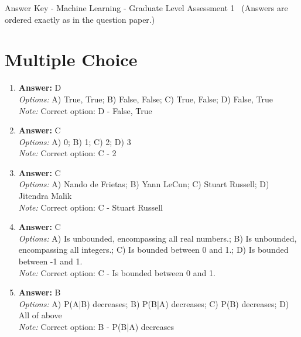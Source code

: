\documentclass[12pt]{article}
\begin{document}
\begin{center}
Answer Key - Machine Learning - Graduate Level Assessment 1 \
\small (Answers are ordered exactly as in the question paper.)
\end{center}

\section*{Multiple Choice}
\begin{enumerate}[label=\arabic*.]
\item \textbf{Answer:} D
\\ \textit{Options:} A) True, True; B) False, False; C) True, False; D) False, True
\\ \textit{Note:} Correct option: D - False, True
\item \textbf{Answer:} C
\\ \textit{Options:} A) 0; B) 1; C) 2; D) 3
\\ \textit{Note:} Correct option: C - 2
\item \textbf{Answer:} C
\\ \textit{Options:} A) Nando de Frietas; B) Yann LeCun; C) Stuart Russell; D) Jitendra Malik
\\ \textit{Note:} Correct option: C - Stuart Russell
\item \textbf{Answer:} C
\\ \textit{Options:} A) Is unbounded, encompassing all real numbers.; B) Is unbounded, encompassing all integers.; C) Is bounded between 0 and 1.; D) Is bounded between -1 and 1.
\\ \textit{Note:} Correct option: C - Is bounded between 0 and 1.
\item \textbf{Answer:} B
\\ \textit{Options:} A) P(A|B) decreases; B) P(B|A) decreases; C) P(B) decreases; D) All of above
\\ \textit{Note:} Correct option: B - P(B|A) decreases
\end{enumerate}
\end{document}
